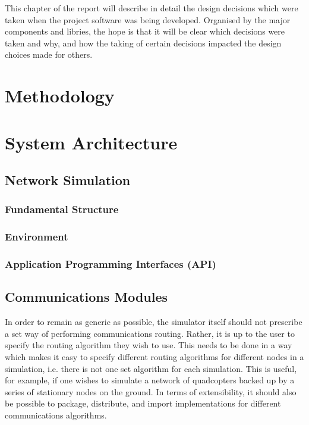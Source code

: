 This chapter of the report will describe in detail the design decisions which were taken when the project software was being developed. Organised by the major components and libries, the hope is that it will be clear which decisions were taken and why, and how the taking of certain decisions impacted the design choices made for others.

\section{Methodology}

\section{System Architecture}

\subsection{Network Simulation}

\subsubsection{Fundamental Structure}

\subsubsection{Environment}

\subsubsection{Application Programming Interfaces (API)}

\subsection{Communications Modules}
In order to remain as generic as possible, the simulator itself should not prescribe a set way of performing communications routing. Rather, it is up to the user to specify the routing algorithm they wish to use. This needs to be done in a way which makes it easy to specify different routing algorithms for different nodes in a simulation, i.e. there is not one set algorithm for each simulation. This is useful, for example, if one wishes to simulate a network of quadcopters backed up by a series of stationary nodes on the ground. In terms of extensibility, it should also be possible to package, distribute, and import implementations for different communications algorithms.

